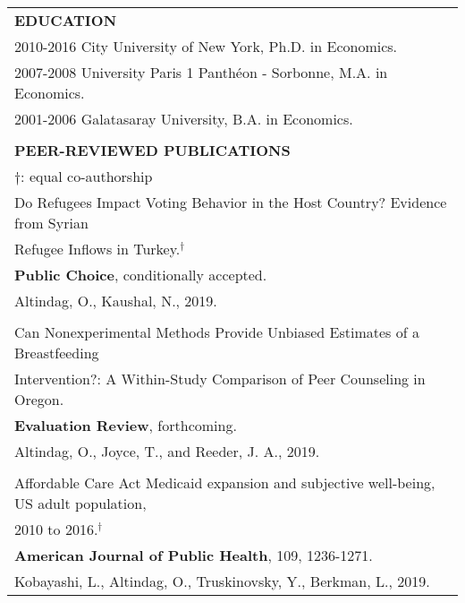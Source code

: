 \documentclass[12 pt]{article}
\begin{document}
\begin{longtable}{ccccc}
\multicolumn{5}{l}{\textbf{EDUCATION}}\\[2 pt]
  \multicolumn{4}{l}{2010\phantom{7}-\phantom{8}2016 \phantom{0000}City University of New York, Ph.D. in Economics.}     \\
    \multicolumn{4}{l}{2007\phantom{1}-\phantom{6}2008 \phantom{000..}University Paris 1 Panth\'{e}on - Sorbonne, M.A. in Economics.} \\
\multicolumn{4}{l}{2001\phantom{1}-\phantom{0}2006 \phantom{000.} Galatasaray University,  B.A. in Economics.}  \\
\\

\multicolumn{5}{l}{\textbf{PEER-REVIEWED PUBLICATIONS }} \\ 
 \multicolumn{5}{l}{\footnotesize{$\dagger$: equal co-authorship}} \\[4 pt]



   \multicolumn{5}{l}{Do Refugees Impact Voting Behavior in the Host Country? Evidence from Syrian} \\
    \multicolumn{5}{l}{Refugee Inflows in Turkey.$^{\dagger}$} \\
     \multicolumn{5}{l}{\textbf{Public Choice}, conditionally accepted.} \\  
 \multicolumn{5}{l}{Altindag, O., Kaushal, N., 2019.} \\
\\

   \multicolumn{5}{l}{Can Nonexperimental Methods Provide Unbiased Estimates of a Breastfeeding} \\
  \multicolumn{5}{l}{Intervention?: A Within-Study Comparison of Peer Counseling in Oregon. } \\
    \multicolumn{5}{l}{\textbf{Evaluation Review}, forthcoming.} \\
 \multicolumn{5}{l}{Altindag, O., Joyce, T., and Reeder, J. A., 2019.} \\



 \\ 

  \multicolumn{5}{l}{Affordable Care Act Medicaid expansion and subjective well-being, US adult population, } \\
    \multicolumn{5}{l}{2010 to 2016.$^{\dagger}$} \\
   \multicolumn{5}{l}{\textbf{American Journal of Public Health}, 109, 1236-1271.} \\
   \multicolumn{5}{l}{Kobayashi, L., Altindag, O., Truskinovsky, Y., Berkman, L., 2019.}  \\


\end{longtable}
\end{document}
